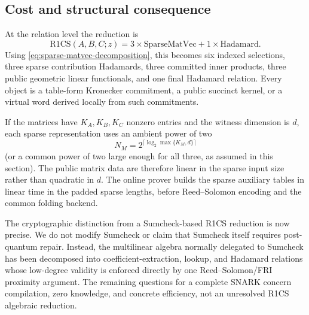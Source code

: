 \subsection{Cost and structural consequence}
\label{sec:r1cs-cost}

At the relation level the reduction is
\begin{equation}
\boxed{
  \mathrm{R1CS}(A,B,C;z)
  =3\times\mathrm{SparseMatVec}
   +1\times\mathrm{Hadamard}.
}
\label{eq:r1cs-decomposition-box}
\end{equation}
Using \eqref{eq:sparse-matvec-decomposition}, this becomes six indexed selections, three sparse contribution Hadamards, three committed inner products, three public geometric linear functionals, and one final Hadamard relation.  Every object is a table-form Kronecker commitment, a public succinct kernel, or a virtual word derived locally from such commitments.

If the matrices have $K_A,K_B,K_C$ nonzero entries and the witness dimension is $d$, each sparse representation uses an ambient power of two
\[
  N_M=2^{\lceil\log_2\max\{K_M,d\}\rceil}
\]
(or a common power of two large enough for all three, as assumed in this section).  The public matrix data are therefore linear in the sparse input size rather than quadratic in $d$.  The online prover builds the sparse auxiliary tables in linear time in the padded sparse lengths, before Reed--Solomon encoding and the common folding backend.

The cryptographic distinction from a Sumcheck-based R1CS reduction is now precise.  We do not modify Sumcheck or claim that Sumcheck itself requires post-quantum repair.  Instead, the multilinear algebra normally delegated to Sumcheck has been decomposed into coefficient-extraction, lookup, and Hadamard relations whose low-degree validity is enforced directly by one Reed--Solomon/FRI proximity argument.  The remaining questions for a complete SNARK concern compilation, zero knowledge, and concrete efficiency, not an unresolved R1CS algebraic reduction.
